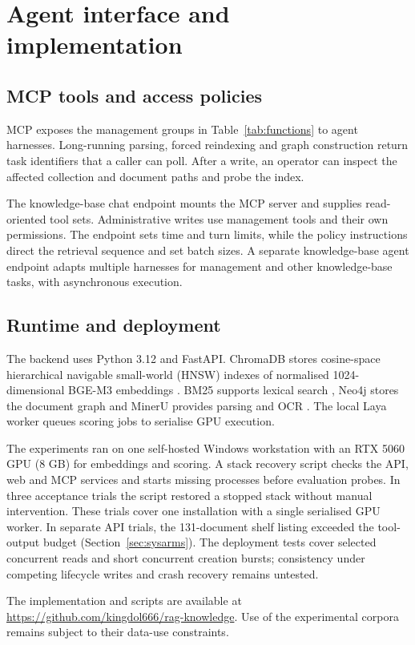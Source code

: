 \section{Agent interface and implementation}
\label{sec:implementation}
\label{sec:impl}

\subsection{MCP tools and access policies}
\label{sec:impl-tools}

MCP exposes the management groups in Table~\ref{tab:functions} to agent
harnesses. Long-running parsing, forced reindexing and graph construction
return task identifiers that a caller can poll. After a write, an operator
can inspect the affected collection and document paths and probe the index.

 The knowledge-base chat endpoint mounts the MCP server and supplies
read-oriented tool sets. Administrative writes use management tools and
their own permissions. The endpoint sets time and turn limits, while the
policy instructions direct the retrieval sequence and set batch sizes.
A separate knowledge-base agent endpoint adapts multiple harnesses for management and
other knowledge-base tasks, with asynchronous execution.

\subsection{Runtime and deployment}
\label{sec:impl-runtime}

The backend uses Python 3.12 and FastAPI. ChromaDB stores cosine-space
hierarchical navigable small-world (HNSW)
indexes of normalised 1024-dimensional BGE-M3 embeddings
\cite{chroma,hnsw,bge-m3}. BM25 supports lexical search \cite{bm25}, Neo4j
stores the document graph \cite{neo4j} and MinerU provides parsing and OCR
\cite{mineru}. The local Laya worker queues scoring jobs to serialise GPU
execution.

The experiments ran on one self-hosted Windows workstation with an RTX
5060 GPU (8 GB) for embeddings and scoring. A stack recovery script checks
the API, web and MCP services and starts missing processes before evaluation
probes. In three acceptance trials the script restored a stopped stack
without manual intervention. These trials cover one installation with a
single serialised GPU worker. In separate API trials, the 131-document
shelf listing exceeded the tool-output budget (Section~\ref{sec:sysarms}).
The deployment tests cover selected concurrent reads and short concurrent
creation bursts; consistency under competing lifecycle writes and crash
recovery remains untested.

The implementation and scripts are available at
\url{https://github.com/kingdol666/rag-knowledge}. Use of the experimental
corpora remains subject to their data-use constraints.
